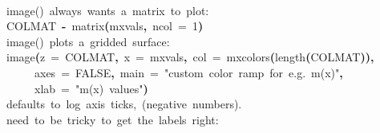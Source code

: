 \documentclass[a4paper]{article}
\newcommand{\hlnumber}[1]{\textcolor[rgb]{0.0823529411764706,0.0784313725490196,0.709803921568627}{#1}}%
\newcommand{\hlfunctioncall}[1]{\textcolor[rgb]{1,0,0}{#1}}%
\newcommand{\hlstring}[1]{\textcolor[rgb]{0.6,0.6,1}{#1}}%
\newcommand{\hlkeyword}[1]{\textcolor[rgb]{0,0,0}{\textbf{#1}}}%
\newcommand{\hlargument}[1]{\textcolor[rgb]{0.694117647058824,0.247058823529412,0.0196078431372549}{#1}}%
\newcommand{\hlcomment}[1]{\textcolor[rgb]{0.8,0.8,0.8}{#1}}%
\newcommand{\hlassignement}[1]{\textcolor[rgb]{0.215686274509804,0.215686274509804,0.384313725490196}{\textbf{#1}}}%
\newcommand{\hlsymbol}[1]{\textcolor[rgb]{0,0,0}{#1}}%
\newcommand{\hlprompt}[1]{\textcolor[rgb]{0,0,0}{#1}}%
\newcommand{\hlstd}[1]{\textcolor[rgb]{0,0,0}{#1}}%
\newenvironment{Houtput}{\raggedright}{%
%
}
\begin{document}
\begin{Houtput}
\normalfont
\hspace*{\fill}\\
\hlstd{}\ttfamily\noindent
\hlprompt{\usebox{\hlnormalsizeboxgreaterthan}{\ }}\hlcomment{\usebox{\hlnormalsizeboxhash}{\ }image(){\ }always{\ }wants{\ }a{\ }matrix{\ }to{\ }plot:}\mbox{}
\normalfont
\hspace*{\fill}\\
\hlstd{}\ttfamily\noindent
\hlprompt{\usebox{\hlnormalsizeboxgreaterthan}{\ }}\hlsymbol{COLMAT}{\ }\hlassignement{\usebox{\hlnormalsizeboxlessthan}-}{\ }\hlfunctioncall{matrix}\hlkeyword{(}\hlsymbol{mxvals}\hlkeyword{,}{\ }\hlargument{ncol}{\ }\hlargument{=}{\ }\hlnumber{1}\hlkeyword{)}\mbox{}
\normalfont
\hspace*{\fill}\\
\hlstd{}\ttfamily\noindent
\hlprompt{\usebox{\hlnormalsizeboxgreaterthan}{\ }}\hlcomment{\usebox{\hlnormalsizeboxhash}{\ }image(){\ }plots{\ }a{\ }gridded{\ }surface:}\mbox{}
\normalfont
\hspace*{\fill}\\
\hlstd{}\ttfamily\noindent
\hlprompt{\usebox{\hlnormalsizeboxgreaterthan}{\ }}\hlfunctioncall{image}\hlkeyword{(}\hlargument{z}{\ }\hlargument{=}{\ }\hlsymbol{COLMAT}\hlkeyword{,}{\ }\hlargument{x}{\ }\hlargument{=}{\ }\hlsymbol{mxvals}\hlkeyword{,}{\ }\hlargument{col}{\ }\hlargument{=}{\ }\hlfunctioncall{mxcolors}\hlkeyword{(}\hlfunctioncall{length}\hlkeyword{(}\hlsymbol{COLMAT}\hlkeyword{)}\hlkeyword{)}\hlkeyword{,}\hspace*{\fill}\\
\hlstd{}\hlprompt{{\ }}{\ }{\ }{\ }{\ }\hlargument{axes}{\ }\hlargument{=}{\ }\hlnumber{FALSE}\hlkeyword{,}{\ }\hlargument{main}{\ }\hlargument{=}{\ }\hlstring{"custom{\ }color{\ }ramp{\ }for{\ }e.g.{\ }m(x)"}\hlkeyword{,}\hspace*{\fill}\\
\hlstd{}\hlprompt{{\ }}{\ }{\ }{\ }{\ }\hlargument{xlab}{\ }\hlargument{=}{\ }\hlstring{"m(x){\ }values"}\hlkeyword{)}\mbox{}
\normalfont
\hspace*{\fill}\\
\hlstd{}\ttfamily\noindent
\hlprompt{\usebox{\hlnormalsizeboxgreaterthan}{\ }}\hlcomment{\usebox{\hlnormalsizeboxhash}{\ }defaults{\ }to{\ }log{\ }axis{\ }ticks,{\ }(negative{\ }numbers).}\mbox{}
\normalfont
\hspace*{\fill}\\
\hlstd{}\ttfamily\noindent
\hlprompt{\usebox{\hlnormalsizeboxgreaterthan}{\ }}\hlcomment{\usebox{\hlnormalsizeboxhash}{\ }need{\ }to{\ }be{\ }tricky{\ }to{\ }get{\ }the{\ }labels{\ }right:}\mbox{}

\end{Houtput}
\end{document}
